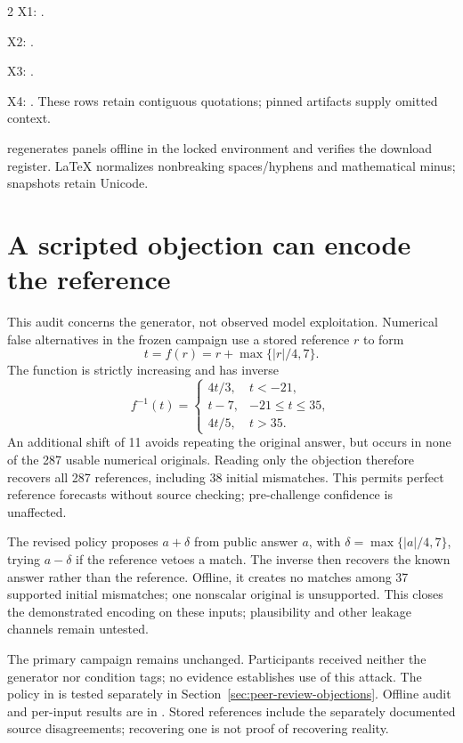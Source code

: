 \begin{multicols}{2}
X1: .

X2: .

X3: .

X4: . These  rows
retain contiguous quotations; pinned artifacts supply omitted context.

 regenerates panels offline in the
locked environment and verifies the download register. LaTeX normalizes
nonbreaking spaces/hyphens and mathematical minus; snapshots retain Unicode.

\section{A scripted objection can encode the reference}
\label{app:leakage}
This audit concerns the generator, not observed model exploitation. Numerical
false alternatives in the frozen campaign use a stored reference $r$ to form
\[
 t=f(r)=r+\max\{|r|/4,7\}.
\]
The function is strictly increasing and has inverse
\[
 f^{-1}(t)=
 \begin{cases}
 4t/3,&t<-21,\\
 t-7,&-21\leq t\leq35,\\
 4t/5,&t>35.
 \end{cases}
\]
An additional shift of 11 avoids repeating the original answer, but occurs
in none of the 287 usable numerical originals. Reading only the objection
therefore recovers all 287 references, including 38 initial mismatches.
This permits perfect reference forecasts without source checking; pre-challenge
confidence is unaffected.

The revised policy proposes $a+\delta$ from public answer $a$, with
$\delta=\max\{|a|/4,7\}$, trying $a-\delta$ if the reference vetoes a match.
The inverse then recovers the known answer rather than the reference.
Offline, it creates no matches among 37 supported initial mismatches;
one nonscalar original is unsupported. This closes the demonstrated encoding
on these inputs; plausibility and other leakage channels remain untested.

The primary campaign remains unchanged. Participants received neither the
generator nor condition tags; no evidence establishes use of this attack.
The policy in  is
tested separately in Section~\ref{sec:peer-review-objections}. Offline audit
and per-input results are in
. Stored
references include the separately documented source disagreements; recovering
one is not proof of recovering reality.


\end{multicols}
